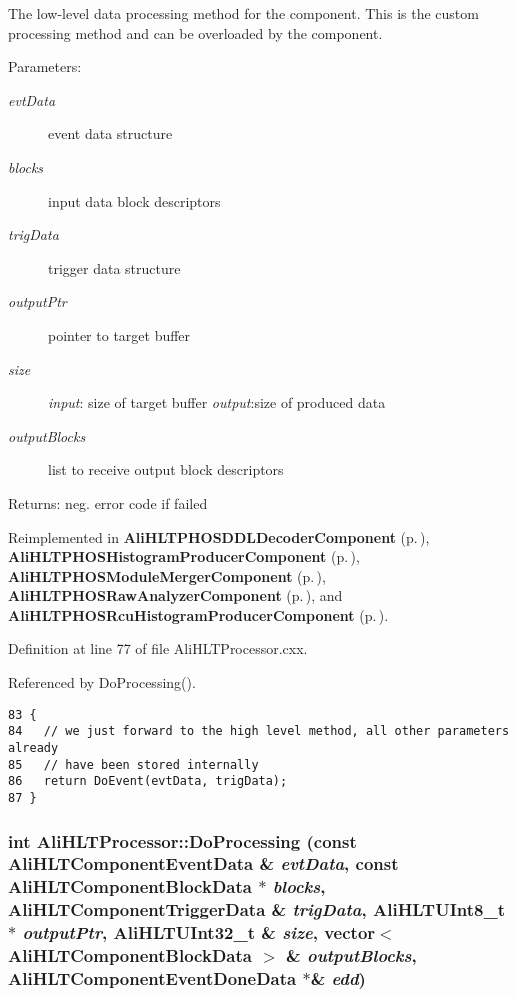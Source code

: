 The low-level data processing method for the component. This is the custom processing method and can be overloaded by the component. \begin{Desc}
\item[Parameters:]
\begin{description}
\item[{\em evt\-Data}]event data structure \item[{\em blocks}]input data block descriptors \item[{\em trig\-Data}]trigger data structure \item[{\em output\-Ptr}]pointer to target buffer \item[{\em size}]{\em input\/}: size of target buffer {\em output\/}:size of produced data \item[{\em output\-Blocks}]list to receive output block descriptors \end{description}
\end{Desc}
\begin{Desc}
\item[Returns:]neg. error code if failed \end{Desc}


Reimplemented in {\bf Ali\-HLTPHOSDDLDecoder\-Component} {\rm (p.\,\pageref{classAliHLTPHOSDDLDecoderComponent_a15})}, {\bf Ali\-HLTPHOSHistogram\-Producer\-Component} {\rm (p.\,\pageref{classAliHLTPHOSHistogramProducerComponent_a7})}, {\bf Ali\-HLTPHOSModule\-Merger\-Component} {\rm (p.\,\pageref{classAliHLTPHOSModuleMergerComponent_a7})}, {\bf Ali\-HLTPHOSRaw\-Analyzer\-Component} {\rm (p.\,\pageref{classAliHLTPHOSRawAnalyzerComponent_d0})}, and {\bf Ali\-HLTPHOSRcu\-Histogram\-Producer\-Component} {\rm (p.\,\pageref{classAliHLTPHOSRcuHistogramProducerComponent_a5})}.

Definition at line 77 of file Ali\-HLTProcessor.cxx.

Referenced by Do\-Processing().

\footnotesize\begin{verbatim}83 {
84   // we just forward to the high level method, all other parameters already
85   // have been stored internally
86   return DoEvent(evtData, trigData);
87 }
\end{verbatim}\normalsize 


\subsubsection{\setlength{\rightskip}{0pt plus 5cm}int Ali\-HLTProcessor::Do\-Processing (const {\bf Ali\-HLTComponent\-Event\-Data} \& {\em evt\-Data}, const {\bf Ali\-HLTComponent\-Block\-Data} $\ast$ {\em blocks}, {\bf Ali\-HLTComponent\-Trigger\-Data} \& {\em trig\-Data}, {\bf Ali\-HLTUInt8\_\-t} $\ast$ {\em output\-Ptr}, {\bf Ali\-HLTUInt32\_\-t} \& {\em size}, vector$<$ {\bf Ali\-HLTComponent\-Block\-Data} $>$ \& {\em output\-Blocks}, {\bf Ali\-HLTComponent\-Event\-Done\-Data} $\ast$\& {\em edd})\hspace{0.3cm}{\tt  [virtual]}}\label{classAliHLTProcessor_a4}


